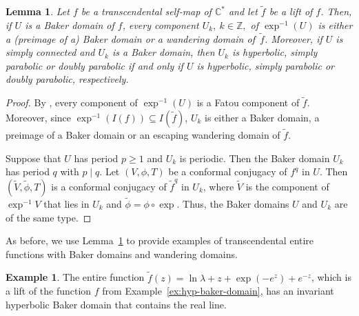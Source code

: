 \documentclass[a4paper, 12pt, reqno]{amsart}
\numberwithin{equation}{section}
\theoremstyle{plain}
\newtheorem{lem}[thm]{Lemma}
\theoremstyle{definition}
\newtheorem{ex}[thm]{Example}
\theoremstyle{remark}
\newcommand{\C}{{\mathbb{C}}}
\newcommand{\Z}{{\mathbb{Z}}}
\begin{document}

\begin{lem}
Let $f$ be a transcendental self-map of $\C^*$ and let $\tilde{f}$ be a lift of $f$. Then, if $U$ is a Baker domain of $f$, every component $U_k,\ k\in\Z,$ of $\exp^{-1}(U)$ is either a (preimage of a) Baker domain or a wandering domain \mbox{of~$\tilde{f}$}. Moreover, if $U$ is simply connected and $U_k$ is a Baker domain, then $U_k$ is hyperbolic, simply parabolic or doubly parabolic if and only if $U$ is hyperbolic, simply parabolic or doubly parabolic, respectively.
\label{lem:semiconj-bd}
\end{lem}
\begin{proof}
By \cite{bergweiler95}, every component of $\exp^{-1}(U)$ is a Fatou component of $\tilde{f}$. Moreover, since $\exp^{-1}(I(f))\subseteq I(\tilde{f})$, $U_k$ is either a Baker domain, a preimage of a Baker domain or an escaping wandering domain of $\tilde{f}$.

Suppose that $U$ has period $p\geqslant 1$ and $U_k$ is periodic. Then the Baker domain $U_k$ has period $q$ with $p\mid q$. Let $(V,\phi,T)$ be a conformal conjugacy of $f^q$ in $U$. Then $(\tilde{V},\tilde{\phi},T)$ is a conformal conjugacy of $\tilde{f}^q$ in $U_k$, where $\tilde{V}$ is the component of $\exp^{-1}V$ that lies in $U_k$ and $\tilde{\phi}=\phi\circ\exp$. Thus, the Baker domains $U$ and $U_k$ are of the same type.
\end{proof}

As before, we use Lemma~\ref{lem:semiconj-bd} to provide examples of transcendental entire functions with Baker domains and wandering domains.

\begin{ex}
The entire function $\tilde{f}(z)\!=\!\ln \lambda\!+\!z\!+\!\exp(-e^z)\!+\!e^{-z}$, which is a lift of the function $f$ from Example~\ref{ex:hyp-baker-domain}, has an invariant hyperbolic Baker domain that contains the real line.
\end{ex}
\end{document}
